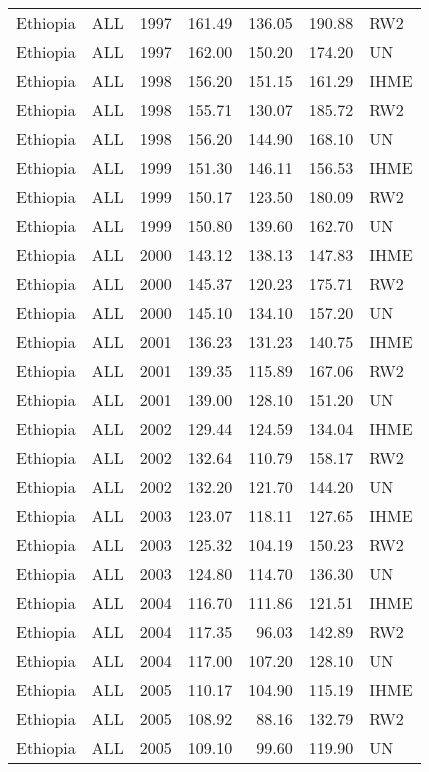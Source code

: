 \begin{longtable}{lllrrrl}
  Ethiopia & ALL & 1997 & 161.49 & 136.05 & 190.88 & RW2 \\ 
  Ethiopia & ALL & 1997 & 162.00 & 150.20 & 174.20 & UN \\ 
  Ethiopia & ALL & 1998 & 156.20 & 151.15 & 161.29 & IHME \\ 
  Ethiopia & ALL & 1998 & 155.71 & 130.07 & 185.72 & RW2 \\ 
  Ethiopia & ALL & 1998 & 156.20 & 144.90 & 168.10 & UN \\ 
  Ethiopia & ALL & 1999 & 151.30 & 146.11 & 156.53 & IHME \\ 
  Ethiopia & ALL & 1999 & 150.17 & 123.50 & 180.09 & RW2 \\ 
  Ethiopia & ALL & 1999 & 150.80 & 139.60 & 162.70 & UN \\ 
  Ethiopia & ALL & 2000 & 143.12 & 138.13 & 147.83 & IHME \\ 
  Ethiopia & ALL & 2000 & 145.37 & 120.23 & 175.71 & RW2 \\ 
  Ethiopia & ALL & 2000 & 145.10 & 134.10 & 157.20 & UN \\ 
  Ethiopia & ALL & 2001 & 136.23 & 131.23 & 140.75 & IHME \\ 
  Ethiopia & ALL & 2001 & 139.35 & 115.89 & 167.06 & RW2 \\ 
  Ethiopia & ALL & 2001 & 139.00 & 128.10 & 151.20 & UN \\ 
  Ethiopia & ALL & 2002 & 129.44 & 124.59 & 134.04 & IHME \\ 
  Ethiopia & ALL & 2002 & 132.64 & 110.79 & 158.17 & RW2 \\ 
  Ethiopia & ALL & 2002 & 132.20 & 121.70 & 144.20 & UN \\ 
  Ethiopia & ALL & 2003 & 123.07 & 118.11 & 127.65 & IHME \\ 
  Ethiopia & ALL & 2003 & 125.32 & 104.19 & 150.23 & RW2 \\ 
  Ethiopia & ALL & 2003 & 124.80 & 114.70 & 136.30 & UN \\ 
  Ethiopia & ALL & 2004 & 116.70 & 111.86 & 121.51 & IHME \\ 
  Ethiopia & ALL & 2004 & 117.35 & 96.03 & 142.89 & RW2 \\ 
  Ethiopia & ALL & 2004 & 117.00 & 107.20 & 128.10 & UN \\ 
  Ethiopia & ALL & 2005 & 110.17 & 104.90 & 115.19 & IHME \\ 
  Ethiopia & ALL & 2005 & 108.92 & 88.16 & 132.79 & RW2 \\ 
  Ethiopia & ALL & 2005 & 109.10 & 99.60 & 119.90 & UN \\ 

\end{longtable}

